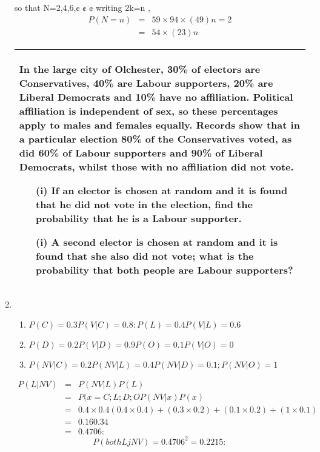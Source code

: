 \documentclass[a4paper,12pt]{article}
\begin{document}
\begin{enumerate}
so that N=2,4,6,¢ ¢ ¢
writing 2k=n ,
\begin{eqnarray*} P(N = n) &=& 5
9 \times  9
4 \times  ( 4
9 )n=2 \\ &=&  5
4 \times  ( 2
3 )n
\end{eqnarray*}

\newpage    
  \begin{table}[ht!]
     \centering
     \begin{tabular}{|p{15cm}|}
     \hline  
In the large city of Olchester, 30\% of electors are Conservatives, 40\% are Labour supporters, 20\% are Liberal Democrats and 10\% have no affiliation.  Political affiliation is independent of sex, so these percentages apply to males and females equally.  Records show that in a particular election 80\% of the Conservatives voted, as did 60\% of Labour supporters and 90\% of Liberal Democrats, whilst those with no affiliation did not vote.  

\begin{itemize}
\item[(i)]If an elector is chosen at random and it is found that he did not vote in the election, find the probability that he is a Labour supporter.  
 
\item[(i)]A second elector is chosen at random and it is found that she also did not vote;  what is the probability that both people are Labour supporters? 
\end{itemize}
\\ \hline 
 \end{tabular}
    \end{table}
\item

\begin{enumerate}
    \item $P(C) = 0.3 P(V |C) = 0.8: P(L) = 0.4 P(V | L) = 0.6$
    \item $P(D) = 0.2 P(V |D) = 0.9 P(O) = 0.1 P(V |O) = 0$
    \item $P(NV |C) = 0.2 P(NV |L) = 0.4 P(NV |D) = 0.1; P(NV |O) = 1$
\end{enumerate}
\begin{eqnarray*}
P(L|NV ) &=& P(NV |L)P(L)\\ 
&=&
P(x=C;L;D;OP(NV |x)P(x)\\
&=& 0.4\times 0.4
(0.4\times 0.4)+(0.3\times 0.2)+(0.1\times 0.2)+(1\times 0.1)\\ &=& 0.16
0.34 \\ &=& 0.4706:
\end{eqnarray*}
\[P(both LjNV ) = 0.4706^2 = 0.2215:\]

\end{enumerate}
\end{document}
